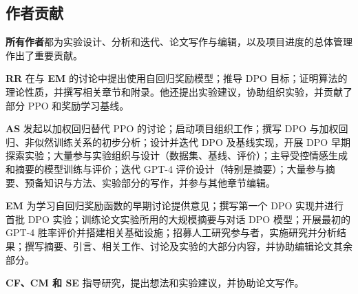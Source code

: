 



\subsection*{作者贡献}
\textbf{所有作者}都为实验设计、分析和迭代、论文写作与编辑，以及项目进度的总体管理作出了重要贡献。

\textbf{RR} 在与 \textbf{EM} 的讨论中提出使用自回归奖励模型；推导 DPO 目标；证明算法的理论性质，并撰写相关章节和附录。他还提出实验建议，协助组织实验，并贡献了部分 PPO 和奖励学习基线。

\textbf{AS} 发起以加权回归替代 PPO 的讨论；启动项目组织工作；撰写 DPO 与加权回归、非似然训练关系的初步分析；设计并迭代 DPO 及基线实现，开展 DPO 早期探索实验；大量参与实验组织与设计（数据集、基线、评价）；主导受控情感生成和摘要的模型训练与评价；迭代 GPT-4 评价设计（特别是摘要）；大量参与摘要、预备知识与方法、实验部分的写作，并参与其他章节编辑。

\textbf{EM} 为学习自回归奖励函数的早期讨论提供意见；撰写第一个 DPO 实现并进行首批 DPO 实验；训练论文实验所用的大规模摘要与对话 DPO 模型；开展最初的 GPT-4 胜率评价并搭建相关基础设施；招募人工研究参与者，实施研究并分析结果；撰写摘要、引言、相关工作、讨论及实验的大部分内容，并协助编辑论文其余部分。


\textbf{CF、CM 和 SE} 指导研究，提出想法和实验建议，并协助论文写作。

